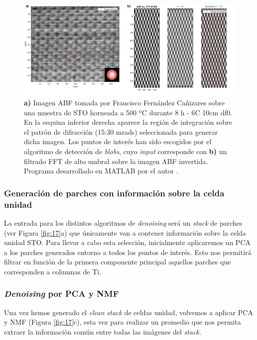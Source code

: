 \begin{figure}[h!]
    \centering
    \includegraphics[width=1\textwidth]{fig/Fig16.png}
    \caption{\textbf{a)} Imagen ABF tomada por Francisco Fernández Cañizares sobre una muestra de STO horneada a 500 ºC durante 8 h - 6C 10cm df0. En la esquina inferior derecha aparece la región de integración sobre el patrón de difracción (15:30 mrads) seleccionada para generar dicha imagen. Los puntos de interés han sido escogidos por el algoritmo de detección de \textit{blobs}, cuyo \textit{input} corresponde con \textbf{b)} un filtrado FFT de alto umbral sobre la imagen ABF invertida. Programa desarrollado en MATLAB por el autor \cite{repo}.}
    \label{fig:16}
\end{figure}

\subsubsection{Generación de parches con información sobre la celda unidad}

La entrada para los distintos algoritmos de \textit{denoising} será un \textit{stack} de parches (ver Figura \ref{fig:17}a) que únicamente van a contener información sobre la celda unidad STO. Para llevar a cabo esta selección, inicialmente aplicaremos un PCA a los parches generados entorno a todos los puntos de interés. Esto nos permitirá filtrar en función de la primera componente principal aquellos parches que corresponden a columnas de Ti.\\

\subsubsection{\textit{Denoising} por PCA y NMF}

Una vez hemos generado el \textit{clean stack} de celdas unidad, volvemos a aplicar PCA y NMF (Figura \ref{fig:17}c), esta vez para realizar un promedio que nos permita extraer la información común entre todas las imágenes del \textit{stack}.

